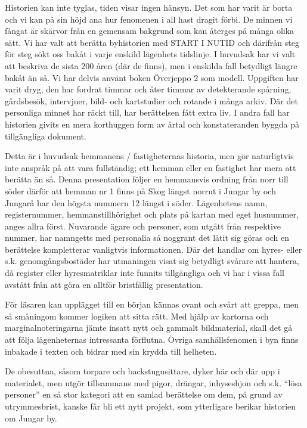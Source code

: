 
%

Historien kan inte tyglas, tiden visar ingen hänsyn. Det som har varit är borta och vi kan på sin höjd ana hur fenomenen i all hast dragit förbi. De minnen vi fångat är skärvor från en gemensam bakgrund som kan återges på många olika sätt. Vi har valt att berätta byhistorien med START I NUTID och därifrån steg för steg sökt oss bakåt i varje enskild lägenhets tidslinje. I huvudsak har vi valt att beskriva de sista 200 åren (där de finns), men i enskilda fall betydligt längre bakåt än så. Vi har delvis använt boken Överjeppo 2 som modell. Uppgiften har varit dryg, den har fordrat timmar och åter timmar av detekterande spårning, gårdsbesök, intervjuer, bild- och kartstudier och rotande i många arkiv. Där det personliga minnet har räckt till, har berättelsen fått extra liv. I andra fall har historien givits en mera korthuggen form av årtal och konstateranden byggda på tillgängliga dokument.

Detta är i huvudsak hemmanens / fastigheternas historia, men gör naturligtvis inte anspråk på att vara fullständig; ett hemman eller en fastighet har mera att berätta än så. Denna presentation följer en hemmansvis ordning från norr till söder därför  att hemman nr 1 finns på Skog längst norrut i Jungar by och Jungarå har den högsta nummern 12 längst i söder. Lägenhetens namn, registernummer, hemmanstillhörighet och plats på kartan med eget husnummer, anges allra först. Nuvarande ägare och personer, som utgått från respektive nummer, har namngetts med personalia så noggrant det låtit sig göras och en berättelse kompletterar vanligtvis informationen. Där det handlar om hyres- eller s.k. genomgångsbostäder har utmaningen visat sig betydligt svårare att hantera, då register eller hyresmatriklar  inte funnits tillgängliga och vi har i vissa fall avstått från att göra en alltför bristfällig presentation.

För läsaren kan upplägget till en början kännas ovant och svårt att greppa, men så småningom kommer logiken att sitta rätt. Med hjälp av kartorna och marginalnoteringarna jämte insatt nytt och gammalt bildmaterial, skall det gå att följa lägenheternas intressanta förflutna. Övriga samhällsfenomen i byn finns inbakade i texten och bidrar med sin krydda till helheten.

De obesuttna, såsom torpare och backstugusittare, dyker här och där upp i materialet, men utgör tillsammans med pigor, drängar, inhyseshjon och s.k. ``lösa personer'' en så stor kategori att en samlad berättelse om dem, på grund av utrymmesbrist,  kanske får bli ett nytt projekt, som ytterligare berikar historien om Jungar by.

